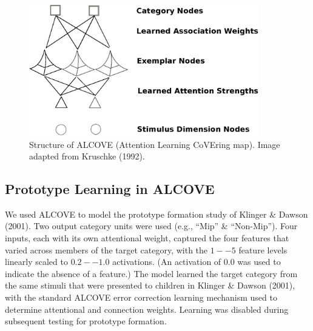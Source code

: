 \begin{figure}[ht]
\begin{center}
	\includegraphics[width=100mm]{figures/alcove.eps}
\end{center}
\caption{Structure of ALCOVE (Attention Learning CoVEring map). Image adapted from Kruschke (1992).}
\label{alcove}
\end{figure} 

\subsection{Prototype Learning in ALCOVE}
We used ALCOVE to model the prototype formation study of Klinger \& Dawson (2001). Two output category units were used (e.g., ``Mip'' \& ``Non-Mip''). Four inputs, each with its own attentional weight, captured the four features that varied across members of the target category, with the $1--5$ feature levels linearly scaled to $0.2--1.0$ activations. (An activation of $0.0$ was used to indicate the absence of a feature.) The model learned the target category from the same stimuli that were presented to children in Klinger \& Dawson (2001), with the standard ALCOVE error correction learning mechanism used to determine attentional and connection weights. Learning was disabled during subsequent testing for prototype formation.



